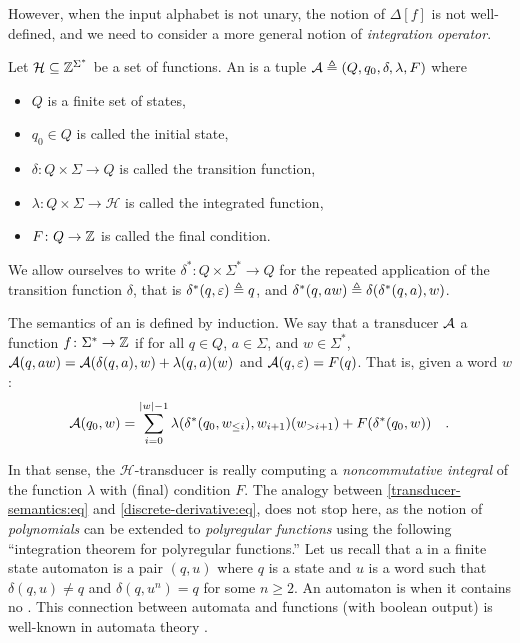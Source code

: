 \documentclass[11pt]{article}
\begin{document}
However, when the input alphabet is not unary, the notion of $\Delta[f]$ is not
well-defined, and we need to consider a more general notion of \emph{integration operator}.
\begin{definition}
    \label{oracle-transducer:def}
    Let $\mathcal{H} \subseteq \mathbb{Z}^{\Sigma^*}$ be a set of
    functions. An 
    is a tuple $\mathcal{A} \triangleq (Q, q_0, \delta, \lambda, F)$
    where
    \begin{itemize}
        \item $Q$ is a finite set of states,
        \item $q_0 \in Q$ is called the initial state,
        \item $\delta \colon Q \times \Sigma \to Q$ is called the transition function,
        \item $\lambda \colon Q \times \Sigma \to \mathcal{H}$ is called the integrated function,
        \item $F \colon Q \to \mathbb{Z}$ is called the final condition.
    \end{itemize}
    We allow ourselves to write $\delta^* \colon Q \times \Sigma^* \to Q$ for
    the repeated application of the transition function $\delta$, that is
    $\delta^*(q,\varepsilon) \triangleq q$, and $\delta^*(q, aw) \triangleq \delta(\delta^*(q,a), w)$.
\end{definition}

\AP The semantics of an  is defined by induction.
We say that a transducer $\mathcal{A}$  a function $f \colon
\Sigma^* \to \mathbb{Z}$ if for all $q \in Q$, $a \in \Sigma$, and $w \in \Sigma^*$,
$\mathcal{A}(q, aw) = \mathcal{A}(\delta(q,a), w) + \lambda(q, a)(w)$ and
$\mathcal{A}(q, \varepsilon) = F(q)$.
That is, given a word $w$:
\begin{equation}
    \label{transducer-semantics:eq}
    \mathcal{A}(q_0, w) 
    = \sum_{i=0}^{|w|-1} \lambda(\delta^*(q_0, w_{\leq i}), w_{i+1})(w_{> i+1}) + F(\delta^*(q_0, w))
    \quad 
    .
\end{equation}

\AP
In that sense, the $\mathcal{H}$-transducer is really computing a
\emph{noncommutative integral} of the function $\lambda$ with (final) condition
$F$. The analogy between \cref{transducer-semantics:eq} and
\cref{discrete-derivative:eq}, does not stop here, as the notion
of \emph{polynomials} can be extended to \emph{polyregular functions} using the
following ``integration theorem for polyregular functions.'' Let us recall that
a  in a finite state automaton is a pair $(q,u)$ where $q$ is a
state and $u$ is a word such that $\delta(q,u) \neq q$ and $\delta(q,u^n) = q$
for some $n \geq 2$. An automaton is  when it contains no
. This connection between  automata and
 functions (with boolean output) is well-known in automata theory
\cite{MNPA71}.
\end{document}
